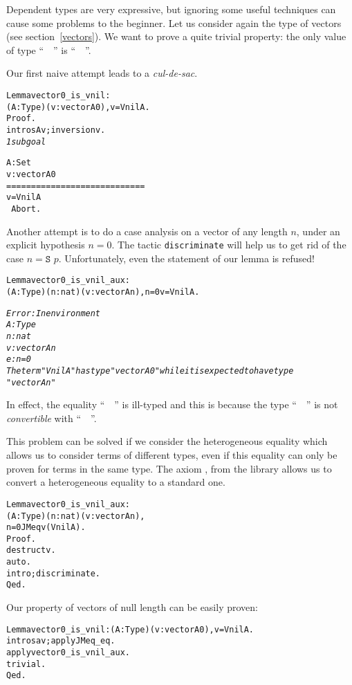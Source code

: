 \documentclass[11pt]{article}
\begin{document}
Dependent types are very expressive, but ignoring some useful
techniques can cause some problems to the beginner.
Let us consider again the type of vectors (see section~\ref{vectors}).
We want to prove a quite trivial property: the only value of type
``~~'' is ``~~''.

Our first naive attempt leads to a \emph{cul-de-sac}.
\begin{alltt}
Lemma vector0_is_vnil : 
  {\prodsym} (A:Type)(v:vector A 0), v = Vnil A.
Proof.
 intros A v;inversion v.
\it
1 subgoal
  
  A : Set
  v : vector A 0
  ============================
   v = Vnil A
\tt
Abort.
\end{alltt}

Another attempt is to do a case analysis on a vector of any length
$n$, under an explicit hypothesis $n=0$. The tactic 
\texttt{discriminate} will help us to get rid of the case 
$n=\texttt{S $p$}$. 
Unfortunately, even the statement of our lemma is refused!

\begin{alltt}
 Lemma vector0_is_vnil_aux : 
 {\prodsym} (A:Type)(n:nat)(v:vector A n), n = 0 {\arrow} v = Vnil A.

\it
Error: In environment
A : Type
n : nat
v : vector A n
e : n = 0
The term "Vnil A" has type "vector A 0" while it is expected to have type
 "vector A n"
\end{alltt}

In effect, the equality ``~~'' is ill-typed and this is
because the type ``~~'' is not \emph{convertible}
with ``~~''.

This problem can be solved if we consider the heterogeneous 
equality  \cite{conor:motive}
which allows us to consider terms of different types, even if this
equality can only be proven for terms in the same type.
The axiom , from the library  allows us to convert a
heterogeneous equality to a standard one.

\begin{alltt}
Lemma vector0_is_vnil_aux : 
   {\prodsym} (A:Type)(n:nat)(v:vector A n), 
      n= 0 {\arrow} JMeq v (Vnil A).
Proof.
 destruct v.
 auto.
 intro; discriminate.
Qed.
\end{alltt}

Our property of vectors of null length can be easily proven:

\begin{alltt}
Lemma vector0_is_vnil : {\prodsym} (A:Type)(v:vector A 0), v = Vnil A.
 intros a v;apply JMeq_eq.
 apply vector0_is_vnil_aux.
 trivial.
Qed.
\end{alltt}
\end{document}
